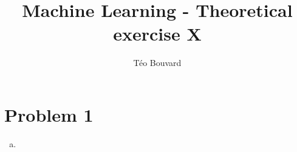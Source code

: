 \documentclass[a4paper, 10pt, twoside]{article}
\begin{document}
\title{Machine Learning - Theoretical exercise X}
\author{T\'eo Bouvard}
\maketitle

\section*{Problem 1}
\begin{enumerate}[a)]
    \item 
\end{enumerate}
\end{document}
